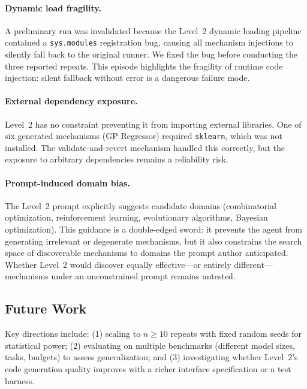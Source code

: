 \paragraph{Dynamic load fragility.}
A preliminary run was invalidated because the Level~2 dynamic loading pipeline
contained a \texttt{sys.modules} registration bug, causing all mechanism
injections to silently fall back to the original runner.
We fixed the bug before conducting the three reported repeats.
This episode highlights the fragility of runtime code injection: silent
fallback without error is a dangerous failure mode.

\paragraph{External dependency exposure.}
Level~2 has no constraint preventing it from importing external libraries.
One of six generated mechanisms (GP Regressor) required \texttt{sklearn}, which
was not installed.
The validate-and-revert mechanism handled this correctly, but the exposure to
arbitrary dependencies remains a reliability risk.

\paragraph{Prompt-induced domain bias.}
The Level~2 prompt explicitly suggests candidate domains (combinatorial
optimization, reinforcement learning, evolutionary algorithms, Bayesian
optimization).
This guidance is a double-edged sword: it prevents the agent from generating
irrelevant or degenerate mechanisms, but it also constrains the search space
of discoverable mechanisms to domains the prompt author anticipated.
Whether Level~2 would discover equally effective---or entirely
different---mechanisms under an unconstrained prompt remains untested.

\subsection{Future Work}

Key directions include:
(1) scaling to $n \geq 10$ repeats with fixed random seeds for statistical power;
(2) evaluating on multiple benchmarks (different model sizes, tasks, budgets)
    to assess generalization; and
(3) investigating whether Level~2's code generation quality improves with
    a richer interface specification or a test harness.

